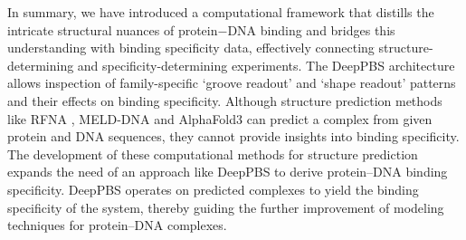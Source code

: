 \par
In summary, we have introduced a computational framework that distills the intricate structural nuances of protein$-$DNA binding and bridges this understanding with binding specificity data, effectively connecting structure-determining and specificity-determining experiments. The DeepPBS architecture allows inspection of family-specific ‘groove readout’ and ‘shape readout’ patterns and their effects on binding specificity. Although structure prediction methods like RFNA \citep{baek2024na}, MELD-DNA \citep{Esmaeeli2023} and AlphaFold3 \citep{Abramson2024} can predict a complex from given protein and DNA sequences, they cannot provide insights into binding specificity. The development of these computational methods for structure prediction expands the need of an approach like DeepPBS to derive protein–DNA binding specificity. DeepPBS operates on predicted complexes to yield the binding specificity of the system, thereby guiding the further improvement of modeling techniques for protein–DNA complexes. 
\par
{}

